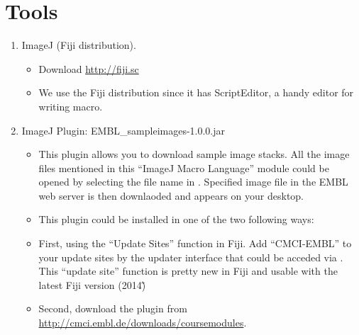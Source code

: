 \section{Tools}
\label{sec:tools}

\begin{enumerate}
  \item ImageJ (Fiji distribution).

\begin{itemize}
    \item Download \url{http://fiji.sc}
    \item We use the Fiji distribution since it has ScriptEditor, a handy editor for writing macro. 
  
\end{itemize}
  \item ImageJ Plugin: EMBL\_sampleimages-1.0.0.jar

\begin{itemize}
     \item This plugin allows you to download sample image stacks. All the image files mentioned in this ``ImageJ Macro Language'' module could be opened by selecting the file name in . Specified image file in the EMBL web server is then downlaoded and appears on your desktop.
    \item This plugin could be installed in one of the two following ways:
    \item First, using the ``Update Sites'' function in Fiji. Add ``CMCI-EMBL'' to your update sites by the updater interface that could be acceded via . This ``update site'' function is pretty new in Fiji and usable with the latest Fiji version (2014\~)        
    \item Second, download the plugin from \url{http://cmci.embl.de/downloads/coursemodules}. 
  
\end{itemize}

\end{enumerate}
 
\newpage